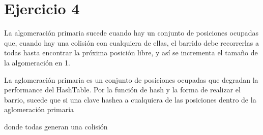 \section*{Ejercicio 4}

La algomeración primaria sucede cuando hay un conjunto de posiciones ocupadas que, cuando hay una colisión con cualquiera de ellas, el barrido debe recorrerlas a todas hasta encontrar la próxima posición libre, y así se incrementa el tamaño de la algomeración en 1.

La aglomeración primaria es un conjunto de posiciones ocupadas que degradan la performance del HashTable. Por la función de hash y la forma de realizar el barrio, sucede que si una clave hashea a cualquiera de las posiciones dentro de la aglomeración primaria

donde todas generan una colisión
